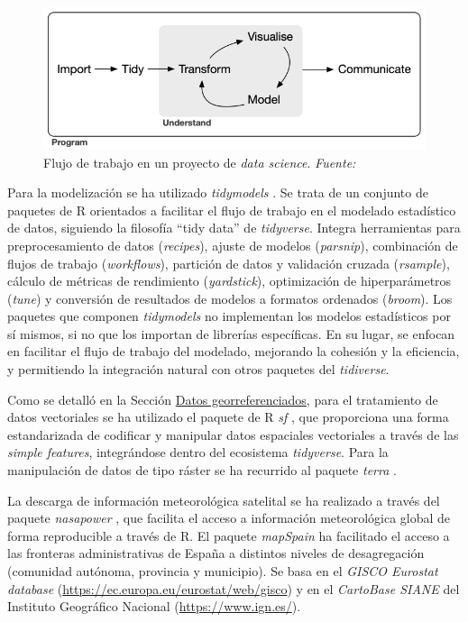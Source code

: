 \documentclass[12pt,a4paper,]{book}
\numberwithin{dummy}{section}
\theoremstyle{ocrenumbox}
\theoremstyle{blacknumex}
\theoremstyle{blacknumbox}
\theoremstyle{ocrenum}
\theoremstyle{ocrenum}
\begin{document}
\begin{figure}[H]

{\centering \includegraphics[width=0.95\linewidth]{graficos/tidyverse_workflow} 

}

\caption{Flujo de trabajo en un proyecto de \textit{data science}. \it Fuente: \citet{tidyversepackage}}\label{fig:tidiverse_workflow}
\end{figure}

Para la modelización se ha utilizado \emph{tidymodels}
\citep{tidymodelspackage}. Se trata de un conjunto de paquetes de R
orientados a facilitar el flujo de trabajo en el modelado estadístico de
datos, siguiendo la filosofía ``tidy data'' de \emph{tidyverse}. Integra
herramientas para preprocesamiento de datos (\emph{recipes}), ajuste de
modelos (\emph{parsnip}), combinación de flujos de trabajo
(\emph{workflows}), partición de datos y validación cruzada
(\emph{rsample}), cálculo de métricas de rendimiento (\emph{yardstick}),
optimización de hiperparámetros (\emph{tune}) y conversión de resultados
de modelos a formatos ordenados (\emph{broom}). Los paquetes que
componen \emph{tidymodels} no implementan los modelos estadísticos por
sí mismos, si no que los importan de librerías específicas. En su lugar,
se enfocan en facilitar el flujo de trabajo del modelado, mejorando la
cohesión y la eficiencia, y permitiendo la integración natural con otros
paquetes del \emph{tidiverse}.

Como se detalló en la Sección
\protect\hyperlink{datos-georreferenciados}{Datos georreferenciados},
para el tratamiento de datos vectoriales se ha utilizado el paquete de R
\emph{sf} \citep{sfpackage}, que proporciona una forma estandarizada de
codificar y manipular datos espaciales vectoriales a través de las
\emph{simple features}, integrándose dentro del ecosistema
\emph{tidyverse}. Para la manipulación de datos de tipo ráster se ha
recurrido al paquete \emph{terra} \citep{terrapackage}.

La descarga de información meteorológica satelital se ha realizado a
través del paquete \emph{nasapower} \citep{nasapower}, que facilita el
acceso a información meteorológica global de forma reproducible a través
de R. El paquete \emph{mapSpain}\citep{R-mapspain} ha facilitado el
acceso a las fronteras administrativas de España a distintos niveles de
desagregación (comunidad autónoma, provincia y municipio). Se basa en el
\emph{GISCO Eurostat database}
(\url{https://ec.europa.eu/eurostat/web/gisco}) y en el \emph{CartoBase
SIANE} del Instituto Geográfico Nacional (\url{https://www.ign.es/}).




%
\end{document}
